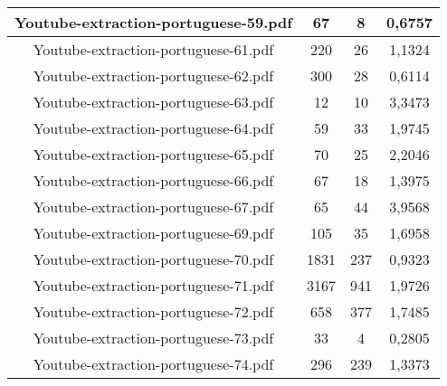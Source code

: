 \documentclass[11pt]{article}
\newlength\mylength
\begin{document}
\begin{center}
\begin{longtable}{||C{.40\mylength}||C{.30\mylength}||C{.30\mylength}||C{.30\mylength}||}
  Youtube-extraction-portuguese-59.pdf & 67 & 8 & 0,6757 \\  \hline
  Youtube-extraction-portuguese-61.pdf & 220 & 26 & 1,1324 \\  \hline
  Youtube-extraction-portuguese-62.pdf & 300 & 28 & 0,6114 \\  \hline
  Youtube-extraction-portuguese-63.pdf & 12 & 10 & 3,3473 \\  \hline
  Youtube-extraction-portuguese-64.pdf & 59 & 33 & 1,9745 \\  \hline
  Youtube-extraction-portuguese-65.pdf & 70 & 25 & 2,2046 \\  \hline
  Youtube-extraction-portuguese-66.pdf & 67 & 18 & 1,3975 \\  \hline
  Youtube-extraction-portuguese-67.pdf & 65 & 44 & 3,9568 \\  \hline
  Youtube-extraction-portuguese-69.pdf & 105 & 35 & 1,6958 \\  \hline
  Youtube-extraction-portuguese-70.pdf & 1831 & 237 & 0,9323 \\  \hline
  Youtube-extraction-portuguese-71.pdf & 3167 & 941 & 1,9726 \\  \hline
  Youtube-extraction-portuguese-72.pdf & 658 & 377 & 1,7485 \\  \hline
  Youtube-extraction-portuguese-73.pdf & 33 & 4 & 0,2805 \\  \hline
  Youtube-extraction-portuguese-74.pdf & 296 & 239 & 1,3373 \\  \hline

\end{longtable}
\end{center}
\end{document}
